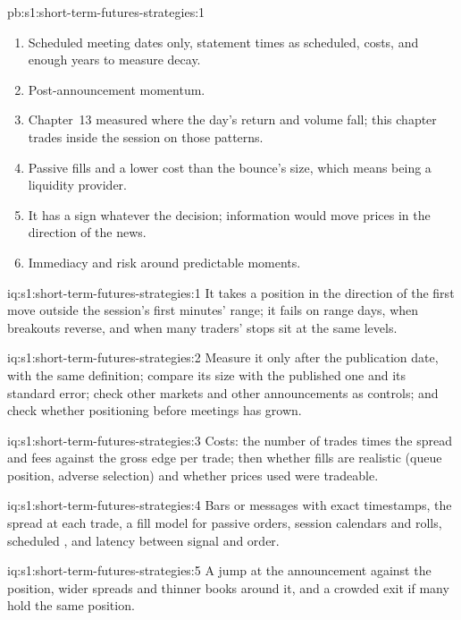 \begin{solution}{pb:s1:short-term-futures-strategies:1}
\begin{enumerate}
\item Scheduled meeting dates only, statement times as scheduled, costs, and enough years to measure decay.
\item Post-announcement momentum.
\item Chapter~13 measured where the day's return and volume fall; this chapter trades inside the session on those patterns.
\item Passive fills and a lower cost than the bounce's size, which means being a liquidity provider.
\item It has a sign whatever the decision; information would move prices in the direction of the news.
\item Immediacy and risk around predictable moments.
\end{enumerate}
\end{solution}

\begin{solution}{iq:s1:short-term-futures-strategies:1}
It takes a position in the direction of the first move outside the session's first minutes' range; it fails on range days, when breakouts reverse,
and when many traders' stops sit at the same levels.
\end{solution}

\begin{solution}{iq:s1:short-term-futures-strategies:2}
Measure it only after the publication date, with the same definition; compare its size with the published one and its standard error; check other
markets and other announcements as controls; and check whether positioning before meetings has grown.
\end{solution}

\begin{solution}{iq:s1:short-term-futures-strategies:3}
Costs: the number of trades times the spread and fees against the gross edge per trade; then whether fills are realistic (queue position, adverse
selection) and whether prices used were tradeable.
\end{solution}

\begin{solution}{iq:s1:short-term-futures-strategies:4}
Bars or messages with exact timestamps, the spread at each trade, a fill model for passive orders, session calendars and rolls, scheduled ,
and latency between signal and order.
\end{solution}

\begin{solution}{iq:s1:short-term-futures-strategies:5}
A jump at the announcement against the position, wider spreads and thinner books around it, and a crowded exit if many hold the same position.
\end{solution}

